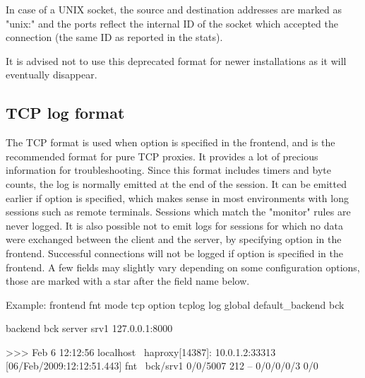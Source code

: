 In case of a UNIX socket, the source and destination addresses are marked as
"unix:" and the ports reflect the internal ID of the socket which accepted the
connection (the same ID as reported in the stats).

It is advised not to use this deprecated format for newer installations as it
will eventually disappear.

\subsection{TCP log format}
\label{sec:tcp_log_format}

The TCP format is used when option  is specified in the frontend, and
is the recommended format for pure TCP proxies. It provides a lot of precious
information for troubleshooting. Since this format includes timers and byte
counts, the log is normally emitted at the end of the session. It can be
emitted earlier if option  is specified, which makes sense in most
environments with long sessions such as remote terminals. Sessions which match
the "monitor" rules are never logged. It is also possible not to emit logs for
sessions for which no data were exchanged between the client and the server, by
specifying option  in the frontend. Successful connections will
not be logged if option  is specified in the frontend. A few
fields may slightly vary depending on some configuration options, those are
marked with a star \chr{*} after the field name below.

  \begin{example}{Example:}
        frontend fnt
            mode tcp
            option tcplog
            log global
            default_backend bck

        backend bck
            server srv1 127.0.0.1:8000

    >>> Feb  6 12:12:56 localhost \
          haproxy[14387]: 10.0.1.2:33313 [06/Feb/2009:12:12:51.443] fnt \
          bck/srv1 0/0/5007 212 -- 0/0/0/0/3 0/0
  \end{example}


